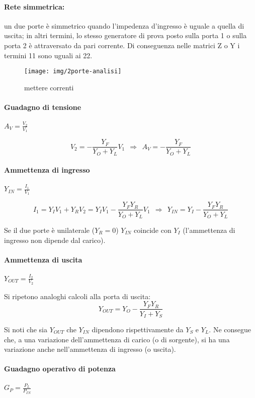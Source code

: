 \paragraph{Rete simmetrica:} un due porte è simmetrico quando l'impedenza d'ingresso è uguale a quella di uscita; in altri termini, lo stesso generatore di prova posto sulla porta 1 o sulla porta 2 è attraversato da pari corrente. Di conseguenza nelle matrici Z o Y i termini 11 sono uguali ai 22.

\begin{figure}[hb]
	\centering
	\texttt{[image: img/2porte-analisi]}
	\caption{mettere correnti}
	\label{fig:2porte-analisi}
\end{figure}


\paragraph{Guadagno di tensione} $A_V = \frac{V_2}{V_1}$

$$V_2 = -\frac{Y_F}{Y_O + Y_L} V_1
~~ \Rightarrow ~~
A_V = -\frac{Y_F}{Y_O + Y_L}$$

\paragraph{Ammettenza di ingresso} $Y_{IN} = \frac{I_1}{V_1}$

$$I_1 = Y_I V_1 + Y_R V_2=
Y_I V_1 - \frac{Y_F Y_R}{Y_O + Y_L} V_1
~~ \Rightarrow ~~
Y_{IN} = Y_I - \frac{Y_F Y_R}{Y_O + Y_L}$$

Se il due porte è unilaterale ($Y_R = 0$) $Y_{IN}$ coincide con $Y_I$ (l'ammettenza di ingresso non dipende dal carico).

  \paragraph{Ammettenza di uscita} $Y_{OUT} = \frac{I_2}{V_2}$
      
  Si ripetono analoghi calcoli alla porta di uscita:
\[Y_{OUT} = Y_O - \frac{Y_F Y_R}{Y_I + Y_S}\]

Si noti che sia $Y_{OUT}$ che $Y_{IN}$ dipendono rispettivamente da $Y_S$ e $Y_L$. Ne consegue che, a una variazione dell'ammettenza di carico (o di sorgente), si ha una variazione anche nell'ammettenza di ingresso (o uscita).
      
\paragraph{Guadagno operativo di potenza} $G_P = \frac{P_{L}}{P_{IN}}$

